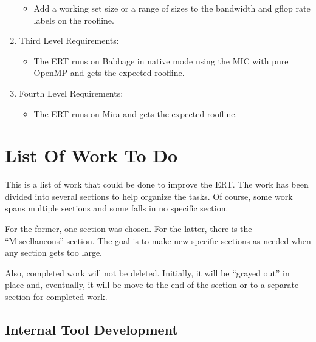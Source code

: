 \begin{enumerate}
\begin{itemize}
\item{Add a working set size or a range of sizes to the bandwidth and gflop
rate labels on the roofline.}

\end{itemize}

\vspace{-0.1in}
\item{Third Level Requirements:}

\begin{itemize}

\vspace{-0.1in}
\item{The ERT runs on Babbage in native mode using the MIC with pure OpenMP
and gets the expected roofline.}

\end{itemize}

\vspace{-0.1in}
\item{Fourth Level Requirements:}

\begin{itemize}

\vspace{-0.1in}
\item{The ERT runs on Mira and gets the expected roofline.}

\end{itemize}

\end{enumerate}

\section{List Of Work To Do}

This is a list of work that could be done to improve the ERT.  The work has
been divided into several sections to help organize the tasks.  Of course,
some work spans multiple sections and some falls in no specific section.

For the former, one section was chosen.  For the latter, there is the
``Miscellaneous'' section.  The goal is to make new specific sections as
needed when any section gets too large.

Also, completed work will not be deleted.  Initially, it will be ``grayed
out'' in place and, eventually, it will be move to the end of the section or
to a separate section for completed work.

\subsection{Internal Tool Development}

